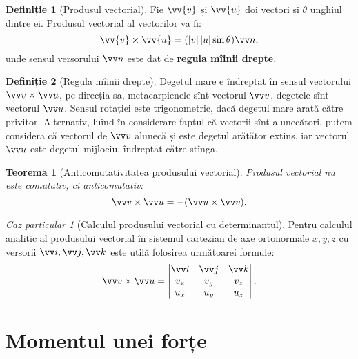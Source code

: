 \documentclass[a4paper]{article}
\theoremstyle{definition}
\newtheorem{definition}{Definiție}[section]
\theoremstyle{plain}%
\newtheorem{theorem}{Teoremă}[section]
\theoremstyle{remark}
\newtheorem{case}{Caz particular}
\begin{document}
\begin{definition}[Produsul vectorial]
	Fie \(\vv{v}\) și \(\vv{u}\) doi vectori și \(\theta\) unghiul dintre ei. Produsul vectorial al vectorilor va fi:
	\begin{equation*}
		\vv{v} \times \vv{u} = (\left|v\right| \left|u\right| \sin \theta) \vv n \text{,}
	\end{equation*}
	unde sensul versorului \(\vv n\) este dat de \textbf{regula mîinii drepte}.
\end{definition}

\begin{definition}[Regula mîinii drepte]
	Degetul mare e îndreptat în sensul vectorului \(\vv v \times \vv u\), pe direcția sa, metacarpienele sînt vectorul \(\vv v\), degetele sînt vectorul \(\vv u\). Sensul rotației este trigonometric, dacă degetul mare arată către privitor. Alternativ, luînd în considerare faptul că vectorii sînt alunecători, putem considera că vectorul de \(\vv v\) alunecă și este degetul arătător extins, iar vectorul \(\vv u\) este degetul mijlociu, îndreptat către stînga.
\end{definition}

\begin{theorem}[Anticomutativitatea produsului vectorial]
	Produsul vectorial nu este comutativ, ci anticomutativ:
	\begin{equation*}
		\vv v \times \vv u = - (\vv u \times \vv v) \text{.}
	\end{equation*}
\end{theorem}

\begin{case}[Calculul produsului vectorial cu determinantul]
	Pentru calculul analitic al produsului vectorial în sistemul cartezian de axe ortonormale \(x, y, z\) cu versorii \(\vv i, \vv j, \vv k\) este utilă folosirea următoarei formule:
	\begin{equation*}
		\vv v \times \vv u =
		\begin{vmatrix}
			\vv i & \vv j & \vv k \\
			v_x   & v_y   & v_z   \\
			u_x   & u_y   & u_z
		\end{vmatrix} \text{.}
	\end{equation*}
\end{case}

\section{Momentul unei forțe}
\end{document}
